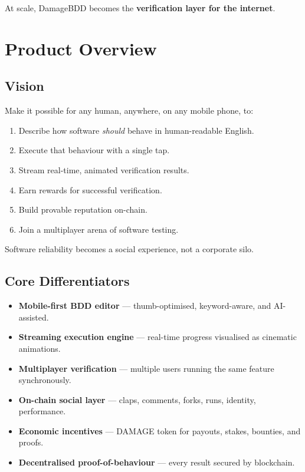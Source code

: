 \documentclass[12pt,a4paper]{article}
\begin{document}
At scale, DamageBDD becomes the \textbf{verification layer for the internet}.

\section{Product Overview}

\subsection{Vision}

Make it possible for any human, anywhere, on any mobile phone, to:

\begin{enumerate}
    \item Describe how software \emph{should} behave in human-readable English.
    \item Execute that behaviour with a single tap.
    \item Stream real-time, animated verification results.
    \item Earn rewards for successful verification.
    \item Build provable reputation on-chain.
    \item Join a multiplayer arena of software testing.
\end{enumerate}

Software reliability becomes a social experience, not a corporate silo.

\subsection{Core Differentiators}

\begin{itemize}[leftmargin=1.4cm]
    \item \textbf{Mobile-first BDD editor} — thumb-optimised, keyword-aware, and AI-assisted.
    \item \textbf{Streaming execution engine} — real-time progress visualised as cinematic animations.
    \item \textbf{Multiplayer verification} — multiple users running the same feature synchronously.
    \item \textbf{On-chain social layer} — claps, comments, forks, runs, identity, performance.
    \item \textbf{Economic incentives} — DAMAGE token for payouts, stakes, bounties, and proofs.
    \item \textbf{Decentralised proof-of-behaviour} — every result secured by blockchain.
\end{itemize}
\end{document}
